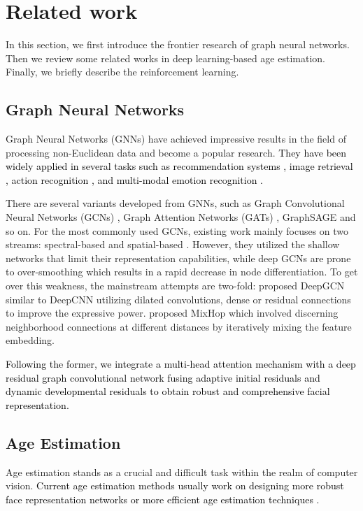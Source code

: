 \section{Related work}
\label{sec:sec2}
In this section, we first introduce the frontier research of graph neural networks. Then we review some related works in deep learning-based age estimation. Finally, we briefly describe the reinforcement learning.

\subsection{Graph Neural Networks}
Graph Neural Networks (GNNs) have achieved impressive results in the field of processing non-Euclidean data and become a popular research. \textcolor{black}{
They have been widely applied in several tasks such as recommendation systems \citep{cui2024rakcr}, image retrieval \citep{qin2024heterogeneous}, action recognition \citep{qiu2024multi}, and multi-modal emotion recognition \citep{meng2024deep}.
}

There are several variants developed from GNNs, such as Graph Convolutional Neural Networks (GCNs) \citep{kipf2016semi}, Graph Attention Networks (GATs) \citep{velivckovic2017graph}, GraphSAGE \citep{hamilton2017inductive} and so on. For the most commonly used GCNs, existing work mainly focuses on two streams: spectral-based \citep{henaff2015deep} and spatial-based \citep{atwood2016diffusion, niepert2016learning}. However, they utilized the shallow networks that limit their representation capabilities, while deep GCNs are prone to over-smoothing which results in a rapid decrease in node differentiation. To get over this weakness, the mainstream attempts are two-fold:  \citet{li2019deepgcns} proposed DeepGCN similar to DeepCNN utilizing dilated convolutions, dense or residual connections to improve the expressive power. \citet{abu2019mixhop} proposed MixHop which involved discerning neighborhood connections at different distances by iteratively mixing the feature embedding. 

\textcolor{black}{
Following the former, we integrate a multi-head attention mechanism with a deep residual graph convolutional network fusing adaptive initial residuals and dynamic developmental residuals to obtain robust and comprehensive facial representation.
}

\subsection{Age Estimation}
Age estimation stands as a crucial and difficult task within the realm of computer vision. 
\textcolor{black}{
Current age estimation methods usually work on designing more robust face representation networks \citep{kuprashevich2023mivolo, shou2025masked, zhang2024groupface} or more efficient age estimation techniques \citep{shin2022moving, wang2023exploiting, chen2023daa}.
}

